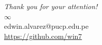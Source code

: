 \documentclass{beamer}
\begin{document}
\begin{frame}[allowframebreaks]
    
    \tiny
\end{frame}

\begin{frame}
    \begin{center}
        {\Huge\textit{Thank you for your attention!}}\\
        $\infty$ \\
        edwin.alvarez@pucp.edu.pe\\
        \url{https://github.com/win7}
    \end{center}
\end{frame}

% 
\end{document}
